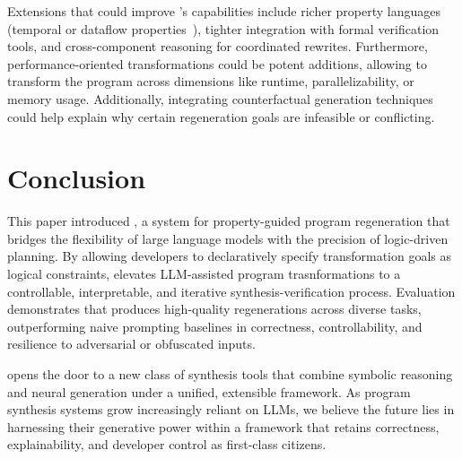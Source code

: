 \documentclass[a4paper,twoside,12pt]{report} %
\begin{document}
Extensions that could improve \sys's capabilities include richer property languages (\eg temporal or dataflow properties~\cite{azzopardi2023ltl,handa2021orderawaredataflowmodelparallel}), tighter integration with formal verification tools, and cross-component reasoning for coordinated rewrites.
Furthermore, performance-oriented transformations could be potent additions, allowing \sys to transform the program across dimensions like runtime, parallelizability, or memory usage.
Additionally, integrating counterfactual generation techniques~\cite{Cabalar_2020} could help explain why certain regeneration goals are infeasible or conflicting.


\chapter{Conclusion}
This paper introduced \sys, a system for property-guided program regeneration
that bridges the flexibility of large language models with the precision of
logic-driven planning.
By allowing developers to declaratively specify
transformation goals as logical constraints, \sys elevates LLM-assisted program
trasnformations to a controllable, interpretable, and iterative synthesis-verification
process.
Evaluation demonstrates that \sys produces high-quality regenerations
across diverse tasks, outperforming naive prompting baselines in correctness,
controllability, and resilience to adversarial or obfuscated inputs.

\sys opens the door to a new class of synthesis tools that combine symbolic
reasoning and neural generation under a unified, extensible framework.
As program synthesis systems grow increasingly reliant on LLMs, we believe the
future lies in harnessing their generative power within a framework that retains
correctness, explainability, and developer control as first-class citizens.

\printbibliography[heading=bibintoc,title={Bibliography}]
\cleardoublepage 
\appendix

\cleartoleftpage

\end{document}
